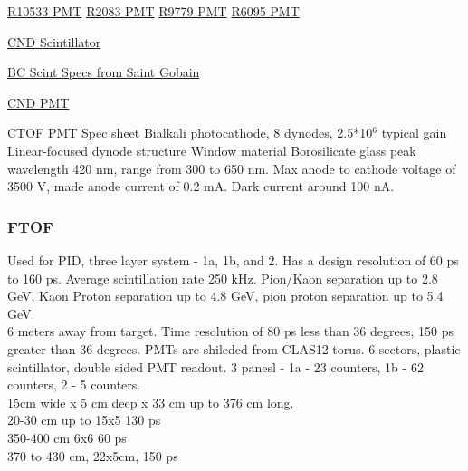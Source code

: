             
            
            \href{https://www.hamamatsu.com/eu/en/product/type/R10533/index.html}{R10533 PMT}
            \href{https://www.hamamatsu.com/eu/en/product/type/R2083/index.html}{R2083 PMT}
            \href{https://pdf1.alldatasheet.com/datasheet-pdf/view/212324/HAMAMATSU/R9779.html}{R9779 PMT}
            \href{https://www.sphere.bc.ca/test/phototubes2/ham/r6095.pdf}{R6095 PMT}
            
            
            
            
            
            
            
            
            
            \href{https://eljentechnology.com/products/plastic-scintillators/ej-200-ej-204-ej-208-ej-212}{CND Scintillator}
            
            
            \href{https://www.crystals.saint-gobain.com/sites/imdf.crystals.com/files/documents/bc400-404-408-412-416-data-sheet.pdf}{BC Scint Specs from Saint Gobain}
            
            
            \href{https://www.hamamatsu.com/eu/en/product/type/R10533/index.html}{CND PMT}
            
            
            \href{https://www.hamamatsu.com/us/en/product/type/R2083/index.html}{CTOF PMT Spec sheet}
            Bialkali photocathode, 8 dynodes, 2.5*10$^6$ typical gain
            Linear-focused dynode structure
            Window material Borosilicate glass
            peak wavelength 420 nm, range from 300 to 650 nm. Max anode to cathode voltage of 3500 V, made anode current of 0.2 mA. Dark current around 100 nA. 
            
            
        
        \subsubsection{FTOF}
            Used for PID, three layer system - 1a, 1b, and 2. Has a design resolution of 60 ps to 160 ps. Average scintillation rate 250 kHz. Pion/Kaon separation up to 2.8 GeV, Kaon Proton separation up to 4.8 GeV, pion proton separation up to 5.4 GeV. \\
            6 meters away from target.
            Time resolution of 80 ps less than 36 degrees, 150 ps greater than 36 degrees. PMTs are shileded from CLAS12 torus. 6 sectors, plastic scintillator, double sided PMT readout. 3 panesl - 1a - 23 counters, 1b - 62 counters, 2 - 5 counters. \\
            15cm wide x 5 cm deep x 33 cm up to 376 cm long.\\
            20-30 cm up to 15x5 130 ps\\
            350-400 cm 6x6 60 ps\\
            370 to 430 cm, 22x5cm, 150 ps\\
            
